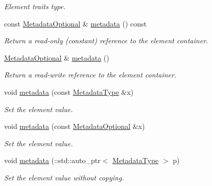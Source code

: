 \begin{DoxyCompactItemize}
\begin{DoxyCompactList}\small\item\em Element traits type. \item\end{DoxyCompactList}\item 
const \hyperlink{classopenstack_1_1xml_1_1Server_a741c48a3af02435ec4a8b6aefd1f8fb5}{MetadataOptional} \& \hyperlink{classopenstack_1_1xml_1_1Server_a717fc6b70e0b0207b917b3be53db41d7}{metadata} () const 
\begin{DoxyCompactList}\small\item\em Return a read-\/only (constant) reference to the element container. \item\end{DoxyCompactList}\item 
\hyperlink{classopenstack_1_1xml_1_1Server_a741c48a3af02435ec4a8b6aefd1f8fb5}{MetadataOptional} \& \hyperlink{classopenstack_1_1xml_1_1Server_a0676cb790babbb8b5272f923d5430146}{metadata} ()
\begin{DoxyCompactList}\small\item\em Return a read-\/write reference to the element container. \item\end{DoxyCompactList}\item 
void \hyperlink{classopenstack_1_1xml_1_1Server_a704b5f56b9f93522c7962a88c5ae767e}{metadata} (const \hyperlink{classopenstack_1_1xml_1_1Metadata}{MetadataType} \&x)
\begin{DoxyCompactList}\small\item\em Set the element value. \item\end{DoxyCompactList}\item 
void \hyperlink{classopenstack_1_1xml_1_1Server_a7bef23916dc035bc80a020706605ec5a}{metadata} (const \hyperlink{classopenstack_1_1xml_1_1Server_a741c48a3af02435ec4a8b6aefd1f8fb5}{MetadataOptional} \&x)
\begin{DoxyCompactList}\small\item\em Set the element value. \item\end{DoxyCompactList}\item 
void \hyperlink{classopenstack_1_1xml_1_1Server_a2efd7cfbff09c850131dddd2e44e97c3}{metadata} (::std::auto\_\-ptr$<$ \hyperlink{classopenstack_1_1xml_1_1Metadata}{MetadataType} $>$ p)
\begin{DoxyCompactList}\small\item\em Set the element value without copying. \item\end{DoxyCompactList}\end{DoxyCompactItemize}
